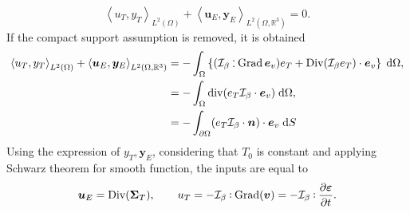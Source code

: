 \[
\left\langle u_T, y_T \right\rangle_{L^2(\Omega)} + \left\langle \bm{u}_E, \bm{y}_E \right\rangle_{L^2(\Omega, \mathbb{R}^3)} = 0.
\]
If the compact support assumption is removed, it is obtained
\begin{equation}\label{eq:balIntThElas}
	\begin{aligned}
	\left\langle u_T, y_T \right\rangle_{L^2(\Omega)} + \left\langle \bm{u}_E, \bm{y}_E \right\rangle_{L^2(\Omega, \mathbb{R}^3)} &= -\int_\Omega \left\{(\mathcal{I}_\beta \cddot \Grad \bm{e}_v) e_T + \Div(\mathcal{I}_\beta e_T) \cdot \bm{e}_v \right\} \d\Omega, \\
	&= -\int_{\Omega} \div(e_T \mathcal{I}_\beta \cdot \bm{e}_v ) \d\Omega, \\
	&= -\int_{\partial \Omega} (e_T \mathcal{I}_\beta \cdot \bm{n}) \cdot \bm{e}_v  \d{S}
	\end{aligned}
\end{equation}
Using the expression of $y_T, \bm{y}_E$, considering that $T_0$ is constant and applying Schwarz theorem for smooth function, the inputs are equal to
\begin{equation*}
\bm{u}_E =  \Div(\bm{\Sigma}_T), \qquad u_T = - \mathcal{I}_\beta \cddot  \Grad(\bm{v}) = - \mathcal{I}_\beta \cddot  \diffp{\bm{\varepsilon}}{t} .
\end{equation*}

